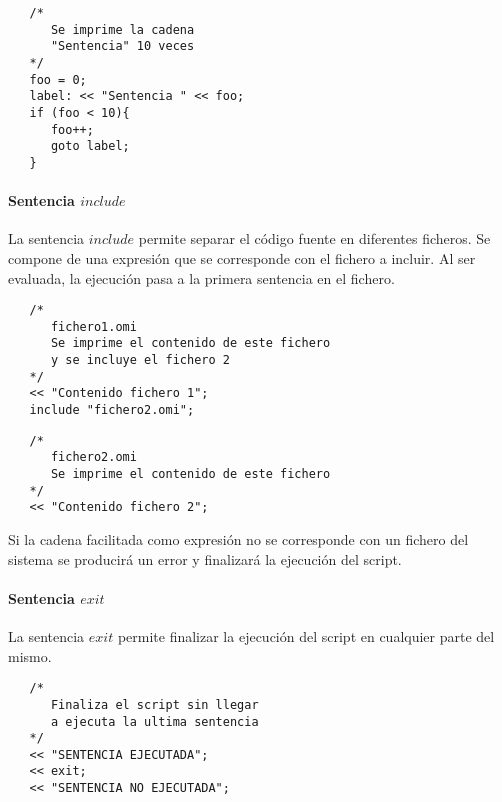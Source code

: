 \begin{lstlisting}
   /*
      Se imprime la cadena
      "Sentencia" 10 veces
   */
   foo = 0;
   label: << "Sentencia " << foo;
   if (foo < 10){
      foo++;
      goto label;
   }
\end{lstlisting}


\paragraph{Sentencia $include$} \label{sec:stmt_include}
La sentencia $include$ permite separar el código fuente en diferentes ficheros. Se compone de una 
expresión que se corresponde con el fichero a incluir. Al ser evaluada,
la ejecución pasa a la primera sentencia en el fichero. \\

\begin{lstlisting}
   /*
      fichero1.omi
      Se imprime el contenido de este fichero
      y se incluye el fichero 2
   */
   << "Contenido fichero 1";
   include "fichero2.omi";
\end{lstlisting}

\begin{lstlisting}
   /*
      fichero2.omi
      Se imprime el contenido de este fichero
   */
   << "Contenido fichero 2";
\end{lstlisting}

Si la cadena facilitada como expresión no se corresponde con un fichero del sistema
se producirá un error y finalizará la ejecución del script.

\paragraph{Sentencia $exit$} \label{sec:stmt_exit}

La sentencia $exit$ permite finalizar la ejecución del script en cualquier parte del mismo. \\

\begin{lstlisting}
   /*
      Finaliza el script sin llegar 
      a ejecuta la ultima sentencia
   */
   << "SENTENCIA EJECUTADA";
   << exit;
   << "SENTENCIA NO EJECUTADA";
\end{lstlisting}

